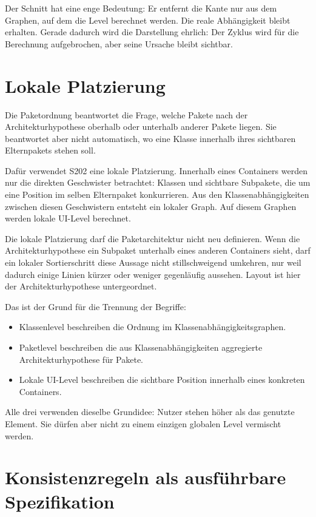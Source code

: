 \documentclass[a4paper,11pt]{article}
\begin{document}
Der Schnitt hat eine enge Bedeutung: Er entfernt die Kante nur aus dem Graphen,
auf dem die Level berechnet werden. Die reale Abh\"angigkeit bleibt erhalten.
Gerade dadurch wird die Darstellung ehrlich: Der Zyklus wird f\"ur die
Berechnung aufgebrochen, aber seine Ursache bleibt sichtbar.

\section{Lokale Platzierung}

Die Paketordnung beantwortet die Frage, welche Pakete nach der
Architekturhypothese oberhalb oder unterhalb anderer Pakete liegen. Sie
beantwortet aber nicht automatisch, wo eine Klasse innerhalb ihres sichtbaren
Elternpakets stehen soll.

Daf\"ur verwendet S202 eine lokale Platzierung. Innerhalb eines Containers
werden nur die direkten Geschwister betrachtet: Klassen und sichtbare
Subpakete, die um eine Position im selben Elternpaket konkurrieren. Aus den
Klassenabh\"angigkeiten zwischen diesen Geschwistern entsteht ein lokaler
Graph. Auf diesem Graphen werden lokale UI-Level berechnet.

Die lokale Platzierung darf die Paketarchitektur nicht neu definieren. Wenn
die Architekturhypothese ein Subpaket unterhalb eines anderen Containers sieht,
darf ein lokaler Sortierschritt diese Aussage nicht stillschweigend umkehren,
nur weil dadurch einige Linien k\"urzer oder weniger gegenl\"aufig aussehen.
Layout ist hier der Architekturhypothese untergeordnet.

Das ist der Grund f\"ur die Trennung der Begriffe:

\begin{itemize}
  \item Klassenlevel beschreiben die Ordnung im Klassenabh\"angigkeitsgraphen.
  \item Paketlevel beschreiben die aus Klassenabh\"angigkeiten aggregierte
        Architekturhypothese f\"ur Pakete.
  \item Lokale UI-Level beschreiben die sichtbare Position innerhalb eines
        konkreten Containers.
\end{itemize}

Alle drei verwenden dieselbe Grundidee: Nutzer stehen h\"oher als das
genutzte Element. Sie d\"urfen aber nicht zu einem einzigen globalen Level
vermischt werden.

\section{Konsistenzregeln als ausf\"uhrbare Spezifikation}
\end{document}
